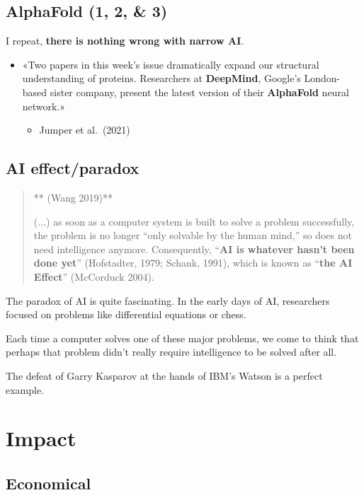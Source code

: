 \documentclass[
  letterpaper,
  DIV=11,
  numbers=noendperiod]{scrartcl}
\providecommand{\tightlist}{%
  \setlength{\itemsep}{0pt}\setlength{\parskip}{0pt}}
\begin{document}
\subsection{AlphaFold (1, 2, \& 3)}\label{alphafold-1-2-3}

I repeat, \textbf{there is nothing wrong with narrow AI}.

\begin{itemize}
\item
  «Two papers in this week's issue dramatically expand our structural
  understanding of proteins. Researchers at \textbf{DeepMind}, Google's
  London-based sister company, present the latest version of their
  \textbf{AlphaFold} neural network.»

  \begin{itemize}
  \tightlist
  \item
    Jumper et al.~(2021)
  \end{itemize}
\end{itemize}

\subsection{AI effect/paradox}\label{ai-effectparadox}

\begin{quote}
** (Wang 2019)**

(\(\ldots\)) as soon as a computer system is built to solve a problem
successfully, the problem is no longer ``only solvable by the human
mind,'' so does not need intelligence anymore. Consequently,
``\textbf{AI is whatever hasn't been done yet}'' (Hofstadter, 1979;
Schank, 1991), which is known as ``\textbf{the AI Effect}'' (McCorduck
2004).
\end{quote}

The paradox of AI is quite fascinating. In the early days of AI,
researchers focused on problems like differential equations or chess.

Each time a computer solves one of these major problems, we come to
think that perhaps that problem didn't really require intelligence to be
solved after all.

The defeat of Garry Kasparov at the hands of IBM's Watson is a perfect
example.

\section{Impact}\label{impact}

\subsection{Economical}\label{economical}
\end{document}
